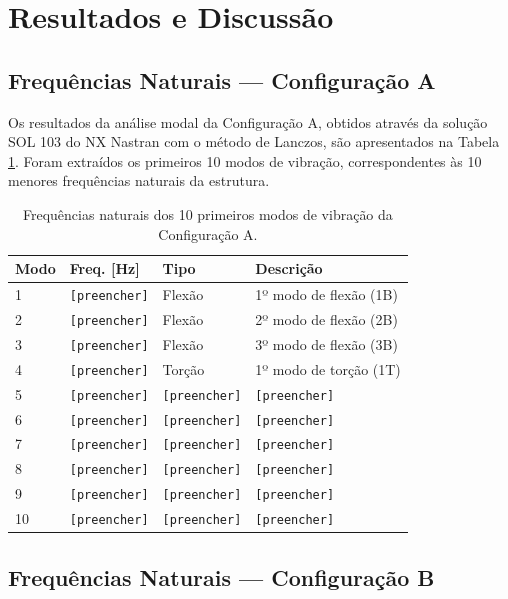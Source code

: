 \documentclass[a4paper,fleqn,noprintline]{cas-dc}
\begin{document}
\section{Resultados e Discussão}
\label{chap:resultados}

\subsection{Frequências Naturais --- Configuração A}

Os resultados da análise modal da Configuração A, obtidos através da solução SOL 103 do NX Nastran com o método de Lanczos, são apresentados na Tabela \ref{tab:freqs_a}. Foram extraídos os primeiros 10 modos de vibração, correspondentes às 10 menores frequências naturais da estrutura.

\begin{table}[h!]
\centering
\caption{Frequências naturais dos 10 primeiros modos de 
vibração da Configuração A.}
\label{tab:freqs_a}
\renewcommand{\arraystretch}{1.4}
\begin{tabularx}{\textwidth}{p{1.5cm} p{3cm} X X}
\toprule
\textbf{Modo} & \textbf{Freq. [\si{\hertz}]} & 
\textbf{Tipo} & \textbf{Descrição} \\
\midrule
1  & \texttt{[preencher]} & Flexão & 1º modo de flexão (1B) \\
2  & \texttt{[preencher]} & Flexão & 2º modo de flexão (2B) \\
3  & \texttt{[preencher]} & Flexão & 3º modo de flexão (3B) \\
4  & \texttt{[preencher]} & Torção & 1º modo de torção (1T) \\
5  & \texttt{[preencher]} & \texttt{[preencher]} & \texttt{[preencher]} \\
6  & \texttt{[preencher]} & \texttt{[preencher]} & \texttt{[preencher]} \\
7  & \texttt{[preencher]} & \texttt{[preencher]} & \texttt{[preencher]} \\
8  & \texttt{[preencher]} & \texttt{[preencher]} & \texttt{[preencher]} \\
9  & \texttt{[preencher]} & \texttt{[preencher]} & \texttt{[preencher]} \\
10 & \texttt{[preencher]} & \texttt{[preencher]} & \texttt{[preencher]} \\
\bottomrule
\end{tabularx}
\end{table}

\subsection{Frequências Naturais --- Configuração B}
\end{document}
